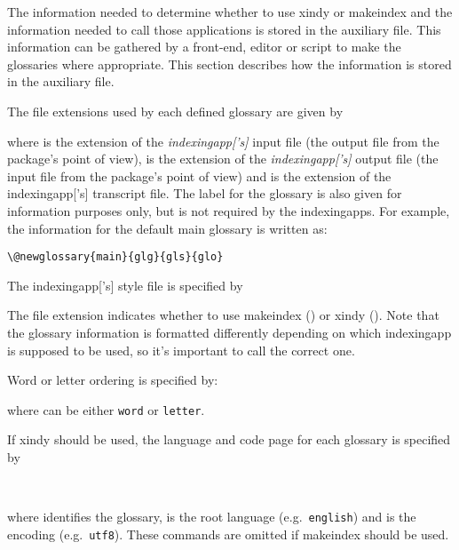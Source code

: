 \documentclass[report,inlinetitle]{nlctdoc}
\begin{document}
The information needed to determine whether to use \gls{xindy}
or \gls{makeindex} and the information needed to call those
applications is stored in the auxiliary file. This information can
be gathered by a front-end, editor or script to make the glossaries
where appropriate. This section describes how the information is
stored in the auxiliary file.

The file extensions used by each defined glossary are given by
\begin{definition}[\DescribeMacro{\@newglossary}]
\end{definition}
where  is the extension of the
\emph{\gls{indexingapp}['s]} input file (the output file from the
 package's point of view),  is the
extension of the \emph{\gls*{indexingapp}['s]} output file (the
input file from the  package's point of view) and
 is the extension of the \gls*{indexingapp}['s] transcript
file. The label for the glossary is also given for information
purposes only, but is not required by the \glspl*{indexingapp}. For
example, the information for the default main glossary is written
as:
\begin{verbatim}
\@newglossary{main}{glg}{gls}{glo}
\end{verbatim}

The \gls{indexingapp}['s] style file is specified by
\begin{definition}[\DescribeMacro{\@istfilename}]
\end{definition}
The file extension indicates whether to use \gls{makeindex}
() or \gls{xindy} (). Note that
the glossary information is formatted differently depending on
which \gls*{indexingapp} is supposed to be used, so it's 
important to call the correct one.

Word or letter ordering is specified by:
\begin{definition}[\DescribeMacro{\@glsorder}]
\end{definition}
where  can be either \texttt{word} or \texttt{letter}.

If \gls{xindy} should be used, the language and code page
for each glossary is specified by
\begin{definition}[\DescribeMacro{\@xdylanguage}\DescribeMacro{\@gls@codepage}]
\\
\end{definition}
where  identifies the glossary,  is
the root language (e.g.\ \texttt{english}) and 
is the encoding (e.g.\ \texttt{utf8}). These commands are omitted
if \gls{makeindex} should be used.
\end{document}
